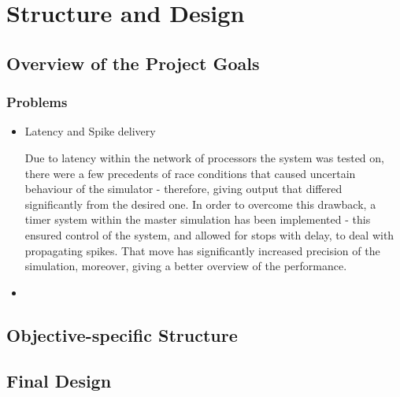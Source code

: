 \chapter{Structure and Design}

\section{Overview of the Project Goals}

\subsection{Problems}
\begin{itemize}

\item {Latency and Spike delivery}

Due to latency within the network of processors the system was tested on, there were a few precedents of race conditions that caused uncertain behaviour of the simulator - therefore, giving output that differed significantly from the desired one. In order to overcome this drawback, a timer system within the master simulation has been implemented - this ensured control of the system, and allowed for stops with delay, to deal with propagating spikes. That move has significantly increased precision of the simulation, moreover, giving a better overview of the performance.

\item {}



\end{itemize}

\section{Objective-specific Structure}

\section{Final Design}
